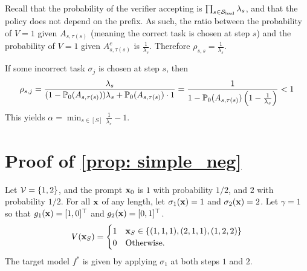 \documentclass{article}
\theoremstyle{plain}
\theoremstyle{definition}
\theoremstyle{remark}
\begin{document}
Recall that the probability of the verifier accepting is $\prod_{s\in \Scal_{\text{bad}}}\lambda_s$, and that the policy does not depend on the prefix. 
As such, the ratio between the probability of $V=1$ given $A_{s, \tau(s)}$ (meaning the correct task is chosen at step $s$) and the probability of $V=1$ given $A_{s, \tau(s)}^c$ is $\frac{1}{\lambda_s}$. 
Therefore $\rho_{s,s} = \frac{1}{\lambda_s}$.

If some incorrect task $\sigma_{j}$ is chosen at step $s$, then
\begin{equation}
    \rho_{s,j} = \frac{\lambda_s}{(1-\P_0(A_{s, \tau(s)})) \lambda_s + \P_0(A_{s, \tau(s)})\cdot 1} = \frac{1}{1 - \P_0(A_{s, \tau(s)})\left(1 - \frac{1}{\lambda_s}\right)} < 1
\end{equation}
This yields $\alpha = \min_{s \in [S]}\frac{1}{\lambda_s} - 1$. 

\section{Proof of \cref{prop: simple_neg}}\label{app: simple_neg}
Let $\Vcal = \{1, 2 \}$, and the prompt $\bx_0$ is $1$ with probability $1/2$, and $2$ with probability $1/2$. For all $\bx$ of any length, let $\sigma_1(\bx) = 1$ and $\sigma_2(\bx) =2$. Let $\gamma=1$ so that $g_1(\bx) = [1, 0]^\top$ and $g_2(\bx) = [0, 1]^\top$.
\begin{align*}
    V(\bx_S) = 
    \begin{cases}
        1 & \bx_S \in \{(1, 1, 1), (2, 1, 1), (1, 2, 2)\} \\ 
        0 & \text{Otherwise}.
    \end{cases}
\end{align*}
The target model $f^*$ is given by applying $\sigma_1$ at both steps $1$ and $2$.
\end{document}
